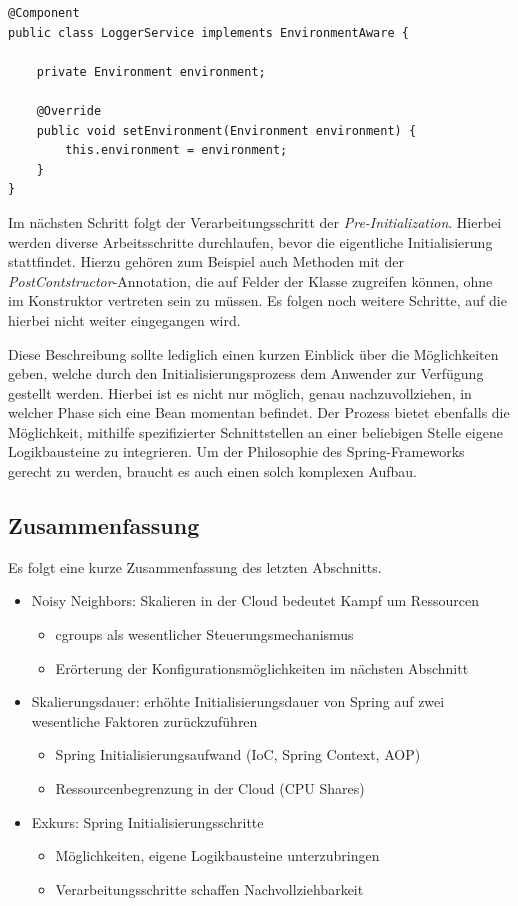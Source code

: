 \begin{lstlisting}[style=javaStyle,caption={Bean - EnvironmentAware \cite{bean-aware}},label=lst:bean-aware]
@Component
public class LoggerService implements EnvironmentAware {

	private Environment environment;

	@Override
	public void setEnvironment(Environment environment) {
		this.environment = environment;
	}
}
\end{lstlisting}
Im nächsten Schritt folgt der Verarbeitungsschritt der \emph{Pre-Initialization}. Hierbei werden diverse Arbeitsschritte durchlaufen, bevor die eigentliche Initialisierung stattfindet. Hierzu gehören zum Beispiel auch Methoden mit der \emph{PostContstructor}-Annotation, die auf Felder der Klasse zugreifen können, ohne im Konstruktor vertreten sein zu müssen. Es folgen noch weitere Schritte, auf die hierbei nicht weiter eingegangen wird. 

Diese Beschreibung sollte lediglich einen kurzen Einblick über die Möglichkeiten geben, welche durch den Initialisierungsprozess dem Anwender zur Verfügung gestellt werden. Hierbei ist es nicht nur möglich, genau nachzuvollziehen, in welcher Phase sich eine Bean momentan befindet. Der Prozess bietet ebenfalls die Möglichkeit, mithilfe spezifizierter Schnittstellen an einer beliebigen Stelle eigene Logikbausteine zu integrieren. Um der Philosophie des Spring-Frameworks gerecht zu werden, braucht es auch einen solch komplexen Aufbau. 


\subsection{Zusammenfassung}
Es folgt eine kurze Zusammenfassung des letzten Abschnitts.

\begin{itemize}
	\item Noisy Neighbors: Skalieren in der Cloud bedeutet Kampf um Ressourcen
	\begin{itemize}
		\item cgroups als wesentlicher Steuerungsmechanismus
		\item Erörterung der Konfigurationsmöglichkeiten im nächsten Abschnitt
	\end{itemize}
	\item Skalierungsdauer: erhöhte Initialisierungsdauer von Spring auf zwei wesentliche Faktoren zurückzuführen
	\begin{itemize}
		\item Spring Initialisierungsaufwand (IoC, Spring Context, AOP)
		\item Ressourcenbegrenzung in der Cloud (CPU Shares)
	\end{itemize}
	\item Exkurs: Spring Initialisierungsschritte
	\begin{itemize}
		\item Möglichkeiten, eigene Logikbausteine unterzubringen
		\item Verarbeitungsschritte schaffen Nachvollziehbarkeit
	\end{itemize}
\end{itemize}

